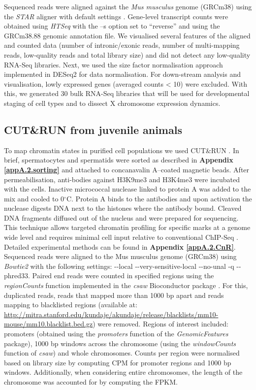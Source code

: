 Sequenced reads were aligned against the \textit{Mus musculus} genome (GRCm38) using the \emph{STAR} aligner with default settings \citep{Dobin2013}. Gene-level transcript counts were obtained using \emph{HTSeq} \citep{Anders2014} with the –s option set to “reverse” and using the GRCm38.88 genomic annotation file. We visualised several features of the aligned and counted data (number of intronic/exonic reads, number of multi-mapping reads, low-quality reads and total library size) and did not detect any low-quality RNA-Seq libraries. Next, we used the size factor normalisation approach implemented in DESeq2 \citep{Love2014} for data normalisation. For down-stream analysis and visualisation, lowly expressed genes (averaged counts < 10) were excluded. With this, we generated 30 bulk RNA-Seq libraries that will be used for developmental staging of cell types and to dissect X chromosome expression dynamics.

\subsection{CUT\&{}RUN from juvenile animals}

To map chromatin states in purified cell populations we used CUT\&{}RUN \citep{Skene2018}. In brief, spermatocytes and spermatids were sorted as described in \textbf{Appendix \ref{appA.2.sorting}} and attached to concanavalin A–coated magnetic beads. After permeabilisation, anti-bodies against H3K9me3 and H3K4me3 were incubated with the cells. Inactive micrococcal nuclease linked to protein A was added to the mix and cooled to 0$^\circ$C. Protein A binds to the antibodies and upon activation the nuclease digests DNA next to the histones where the antibody bound. Cleaved DNA fragments diffused out of the nucleus and were prepared for sequencing. This technique allows targeted chromatin profiling for specific marks at a genome wide level and requires minimal cell input relative to conventional ChIP-Seq \citep{Skene2018}. Detailed experimental methods can be found in \textbf{Appendix \ref{appA.2.CnR}}.\\

Sequenced reads were aligned to the Mus musculus genome (GRCm38) using \textit{Bowtie2} with the following settings: -{}-local -{}-very-sensitive-local -{}-no-unal -q -{}-phred33. Paired end reads were counted in specified regions using the \textit{regionCounts} function implemented in the \textit{csaw} Bioconductor package \citep{Lun2015}. For this, duplicated reads, reads that mapped more than 1000 bp apart and reads mapping to blacklisted regions (available at: \url{http://mitra.stanford.edu/kundaje/akundaje/release/blacklists/mm10-mouse/mm10.blacklist.bed.gz}) were removed. Regions of interest included: promoters (obtained using the \textit{promoters} function of the \textit{GenomicFeatures} package), 1000 bp windows across the chromosome (using the \textit{windowCounts} function of \textit{csaw}) and whole chromosomes. Counts per region were normalised based on library size by computing \gls{CPM} for promoter regions and 1000 bp windows. Additionally, when considering entire chromosomes, the length of the chromosome was accounted for by computing the \gls{FPKM}. 

